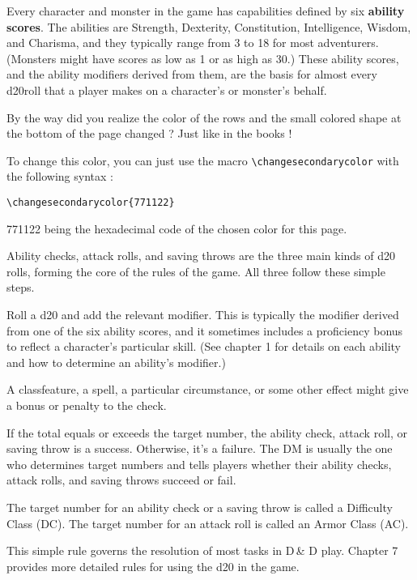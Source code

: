 \documentclass[headings=openany, headings=optiontoheadandtoc]{scrbook}
\begin{document}
Every character and monster in the game has capabilities defined by six \textbf{ability scores}. The abilities are Strength, Dexterity, Constitution, Intelligence, Wisdom, and Charisma, and they typically range from 3 to 18 for most adventurers. (Monsters might have scores as low as 1 or as high as 30.) These ability scores, and the ability modifiers derived from them, are the basis for almost every d20roll that a player makes on a character’s or monster’s behalf.

\begin{mybox}
By the way did you realize the color of the rows and the small colored shape at the bottom of the page changed ? Just like in the books !

To change this color, you can just use the macro \texttt{\textbackslash changesecondarycolor} with the following syntax :
\begin{verbatim}
\changesecondarycolor{771122} 
\end{verbatim}
771122 being the hexadecimal code of the chosen color for this page.

\end{mybox}

Ability checks, attack rolls, and saving throws are the three main kinds of d20 rolls, forming the core of the rules of the game. All three follow these simple steps.
\begin{enumerate}
 Roll a d20 and add the relevant modifier. This is typically the modifier derived from one of the six ability scores, and it sometimes includes a proficiency bonus to reflect a character’s particular skill. (See chapter 1 for details on each ability and how to determine an ability’s modifier.)

 A classfeature, a spell, a particular circumstance, or some other effect might give a bonus or penalty to the check.

 If the total equals or exceeds the target number, the ability check, attack roll, or saving throw is a success. Otherwise, it’s a failure. The DM is usually the one who determines target 
numbers and tells players whether their ability checks, attack rolls, and saving throws succeed or fail.

The target number for an ability check or a saving throw is called a Difficulty Class (DC). The target number for an attack roll is called an Armor Class (AC). 

This simple rule governs the resolution of most tasks in D\,\& D play. Chapter 7 provides more detailed rules for using the d20 in the game.
\end{enumerate}
\end{document}
